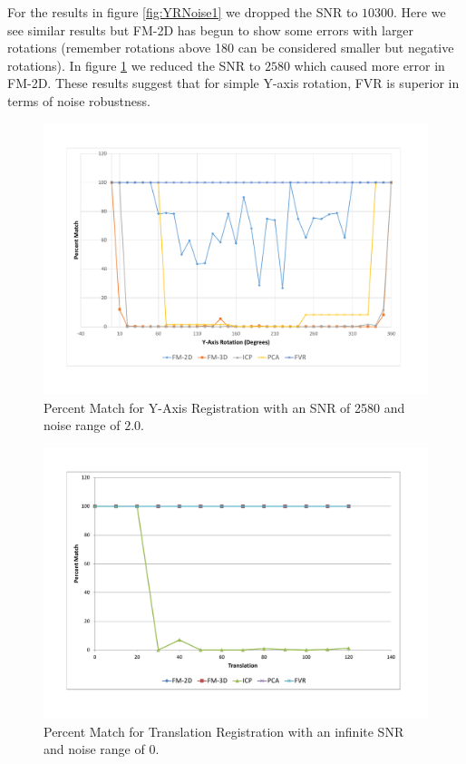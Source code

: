 For the results in figure \ref{fig:YRNoise1} we dropped the SNR to $10300$. Here we see similar results but FM-2D has begun to show some errors with larger rotations (remember rotations above 180 can be considered smaller but negative rotations). In figure \ref{fig:YRNoise2} we reduced the SNR to $2580$ which caused more error in FM-2D. These results suggest that for simple Y-axis rotation, FVR is superior in terms of noise robustness. 

\begin{figure}[t]
\centering
\includegraphics[width=6.0in]{images/results/noise/YRNoise2}
\caption{Percent Match for Y-Axis Registration with an SNR of 2580 and noise range of $2.0$.}
\label{fig:YRNoise2}
\end{figure}


\begin{figure}[t]
\centering
\includegraphics[width=6.0in]{images/results/noise/TransNoise0}
\caption{Percent Match for Translation Registration with an infinite SNR and noise range of $0$.}
\label{fig:TNoise0}
\end{figure}


